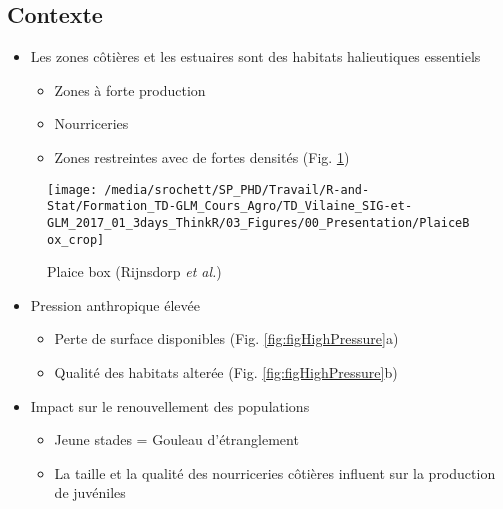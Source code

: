 \documentclass[french,a4paper]{article}
\providecommand{\tightlist}{%
  \setlength{\itemsep}{0pt}\setlength{\parskip}{0pt}}
\begin{document}
\hypertarget{contexte}{%
\subsection{Contexte}\label{contexte}}

\begin{itemize}
\tightlist
\item
  Les zones côtières et les estuaires sont des habitats halieutiques
  essentiels

  \begin{itemize}
  \tightlist
  \item
    Zones à forte production
  \item
    Nourriceries
  \item
    Zones restreintes avec de fortes densités (Fig.
    \ref{fig:figPlaiceBox})
  \end{itemize}
\end{itemize}



\begin{figure}[!h]

{\centering \texttt{[image: /media/srochett/SP\_PHD/Travail/R-and-Stat/Formation\_TD-GLM\_Cours\_Agro/TD\_Vilaine\_SIG-et-GLM\_2017\_01\_3days\_ThinkR/03\_Figures/00\_Presentation/PlaiceBox\_crop]} 

}

\caption{Plaice box (Rijnsdorp \emph{et al.})}\label{fig:figPlaiceBox}
\end{figure}

\begin{itemize}
\tightlist
\item
  Pression anthropique élevée

  \begin{itemize}
  \tightlist
  \item
    Perte de surface disponibles (Fig. \ref{fig:figHighPressure}a)
  \item
    Qualité des habitats alterée (Fig. \ref{fig:figHighPressure}b)
  \end{itemize}
\end{itemize}




\begin{itemize}
\tightlist
\item
  Impact sur le renouvellement des populations

  \begin{itemize}
  \tightlist
  \item
    Jeune stades = Gouleau d'étranglement
  \item
    La taille et la qualité des nourriceries côtières influent sur la
    production de juvéniles
  \end{itemize}
\end{itemize}
\end{document}

